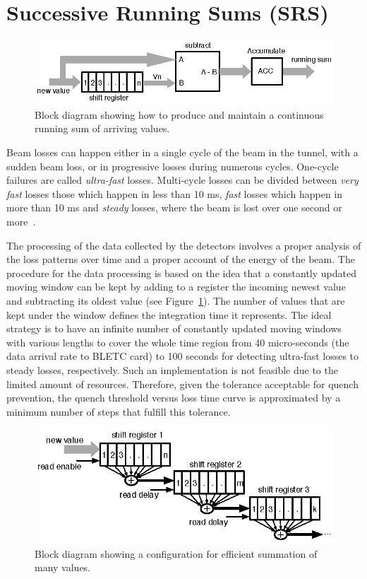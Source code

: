 \documentclass{llncs}
\begin{document}
\section{Successive Running Sums (SRS)}
\label{sec-SRS}

\begin{figure}[t]
  \centering \includegraphics{rs.eps}
   \caption{Block diagram showing how to produce and maintain a continuous running sum of arriving values.}
  \label{fig:RS-basic}
\end{figure}

Beam losses can happen either in a single cycle of the beam in the tunnel, with a sudden beam loss, or in progressive losses during numerous cycles. One-cycle failures are called \emph{ultra-fast} losses. Multi-cycle losses can be divided between \emph{very fast} losses those which happen in less than 10 ms, \emph{fast} losses which happen in more than 10 ms and \emph{steady} losses, where the beam is lost over one second or more~\cite{Schmidt-ICFA}.


The processing of the data collected by the detectors involves a proper analysis of the loss patterns over time and a proper account of the energy of the beam. The procedure for the data processing is based on the idea that a constantly updated moving window can be kept by adding to a register the incoming newest value and subtracting its oldest value (see Figure~\ref{fig:RS-basic}). The number of values that are kept under the window defines the integration time it represents.  The ideal strategy is to have an infinite number of constantly updated moving windows with various lengths to cover the whole time region from 40 micro-seconds (the data arrival rate to BLETC card)  to 100 seconds for detecting ultra-fast losses to steady losses, respectively. Such an implementation is not feasible due to the limited amount of resources. Therefore, given the tolerance acceptable for quench prevention, the quench threshold versus loss time curve is approximated by a minimum number of steps that fulfill this tolerance.

\begin{figure}[t]
  \centering \includegraphics{SRS-basic.eps}
   \caption{Block diagram showing a configuration for efficient summation of many values.}
  \label{fig:SRS-basic}
\end{figure}
\end{document}
